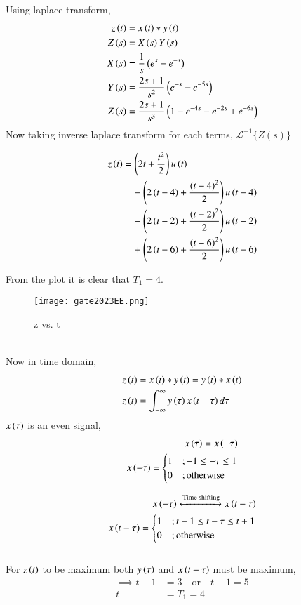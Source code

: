 \documentclass[a4,12pt,twocolumn]{IEEEtran}
\begin{document}
\solution

Using laplace transform,
\begin{align}
z\left(t\right) &=x\left(t\right)*y\left(t\right) \\
Z\left(s\right) &=X\left(s\right)Y\left(s\right) \\
X\left(s\right) &= \frac{1}{s} \left(e^{s}-e^{-s}\right) \\
Y\left(s\right) &= \frac{2s+1}{s^2} \left(e^{-s}-e^{-5s}\right)\\
Z\left(s\right) &= \frac{2s+1}{s^3} \left(1-e^{-4s}-e^{-2s}+e^{-6s}\right)
\end{align}
Now taking inverse laplace transform for each terms, $\mathscr{L^{-1}} \{Z(s)\}$
\begin{multicols}{2}
\begin{align}
z\left(t\right) &=\left(2t+\frac{t^2}{2}\right) u\left(t\right) \nonumber \\
&\quad -\left(2\left(t-4\right)+\frac{\left(t-4\right)^2}{2}\right)u\left(t-4\right) \nonumber \\
&\quad -\left(2\left(t-2\right)+\frac{\left(t-2\right)^2}{2}\right)u\left(t-2\right) \nonumber \\
&\quad +\left(2\left(t-6\right)+\frac{\left(t-6\right)^2}{2}\right)u\left(t-6\right) \nonumber\\
\end{align}
\end{multicols}
From the plot it is clear that $T_1=4$.\\
\begin{figure}[h]
\centering
   \texttt{[image: gate2023EE.png]}
   \caption{z vs. t}
   \label{fig:gate2023EE1}
 \end{figure}\\
Now in time domain,
 \begin{align}
z\left(t\right) &=x\left(t\right)*y\left(t\right) = y\left(t\right)*x\left(t\right)\\
z\left(t\right) &=\int_{-\infty}^{\infty} y\left(\tau\right)x\left(t-\tau\right)d\tau
\end{align}
$x\left(\tau\right)$ is an even signal,
\begin{align}
x\left(\tau\right)= x\left(-\tau\right)\\
 x\left(-\tau\right)= 
    \begin{cases}
        1 & ; -1\leq -\tau \leq 1 \\
        0 & ; \text{otherwise} \\
    \end{cases}
    \end{align}
    
    \begin{align}
    x\left(-\tau\right) \xleftrightarrow{\text{Time shifting}} x\left(t-\tau\right)\\
    x\left(t-\tau\right)= 
    \begin{cases}
        1 & ; t-1\leq t-\tau \leq t+1 \\
        0 & ; \text{otherwise} \\
    \end{cases}
\end{align}\\
For $z\left(t\right)$ to be maximum both $y\left(\tau\right)$ and $x\left(t-\tau\right)$ must be maximum,
\begin{align}
\implies t-1 &= 3 \quad \text{or} \quad t+1 = 5 \nonumber \\
t &= T_1 = 4 \nonumber
\end{align}
\end{document}
